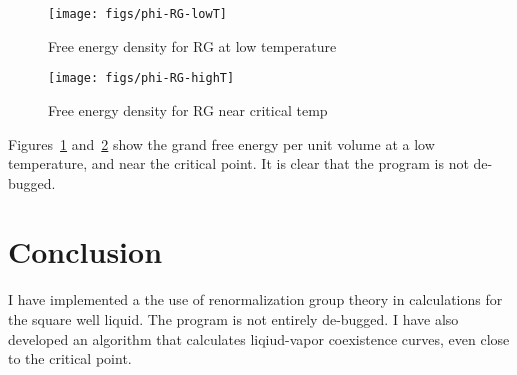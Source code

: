\documentclass[letterpaper,twocolumn,amsmath,amssymb,prb]{revtex4-1}
\newcommand{\1}{\ensuremath{\textbf{r}_1}}
\newcommand{\2}{\ensuremath{\textbf{r}_2}}
\newcommand{\3}{\ensuremath{\textbf{r}_3}}
\newcommand{\4}{\ensuremath{\textbf{r}_4}}
\begin{document}
\begin{figure}
  \begin{center}
  \texttt{[image: figs/phi-RG-lowT]}
  \end{center}
  \caption{Free energy density for RG at low temperature}
  \label{fig:phi-RG-lowT}
\end{figure}

\begin{figure}
  \begin{center}
  \texttt{[image: figs/phi-RG-highT]}
  \end{center}
  \caption{Free energy density for RG near critical temp}
  \label{fig:phi-RG-highT}
\end{figure}

Figures~\ref{fig:phi-RG-lowT} and~\ref{fig:phi-RG-highT} show the grand free energy per unit volume at a low temperature, and near the critical point. It is clear that the program is not de-bugged.



\section{Conclusion}
I have implemented a the use of renormalization group theory in calculations for the square well liquid. The program is not entirely de-bugged. I have also developed an algorithm that calculates liqiud-vapor coexistence curves, even close to the critical point.



\end{document}
